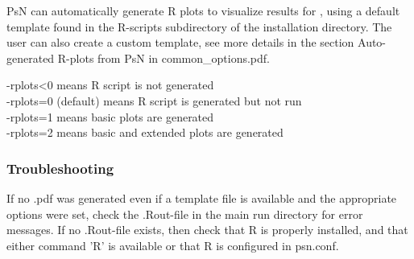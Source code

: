 PsN can automatically generate R plots to visualize results for \guidetoolname, using a default template found in the R-scripts subdirectory of the installation directory. The user can also create a custom template, see more details in the section Auto-generated R-plots from PsN in common\_options.pdf.

\rplotsconditions

\begin{optionlist}
-rplots<0 means R script is not generated\\ 
-rplots=0 (default) means R script is generated but not run\\ 
-rplots=1 means basic plots are generated\\													  
-rplots=2 means basic and extended plots are generated\\													  
\nextopt
\end{optionlist}

\subsubsection*{Troubleshooting}
If no .pdf was generated even if a template file is available and the appropriate options were set, check the .Rout-file in the main run directory for error messages. If no .Rout-file exists, then check that R is properly installed, and that either command 'R' is available or that R is configured in psn.conf.
